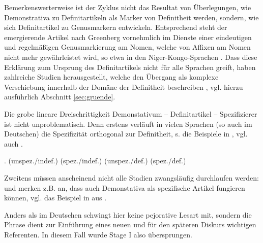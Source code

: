 Bemerkenswerterweise ist der Zyklus nicht das Resultat von Überlegungen, wie Demonstrativa zu Definitartikeln als Marker von Definitheit werden, sondern, wie sich Definitartikel zu Genusmarkern entwickeln. Entsprechend steht der emergierende Artikel nach Greenberg vornehmlich im Dienste einer eindeutigen und regelmäßigen Genusmarkierung am Nomen, welche von Affixen am Nomen nicht mehr gewährleistet wird, so etwa in den Niger-Kongo-Sprachen \parencite[55, 62]{Greenberg1978}. Dass diese Erklärung zum Ursprung des Definitartikels nicht für alle Sprachen greift, haben zahlreiche Studien herausgestellt, welche den Übergang als komplexe Verschiebung innerhalb der Domäne der Definitheit beschreiben \parencite[z.B.][]{Himmelmann1997,Lyons1999,Leiss2000,Demske2001}, vgl. hierzu ausführlich Abschnitt \ref{sec:gruende}.

Die grobe lineare Dreischrittigkeit Demonstativum -- Definitartikel -- Spezifizierer ist nicht unproblematisch. Denn erstens verläuft in vielen Sprachen (so auch im Deutschen) die Spezifizität orthogonal zur Definitheit, s. die Beispiele in  \parencite[in Adaption an][245]{Studler2011}, vgl. auch \textcite{Lyons1999}. 

\begin{exe}
	\ex \label{ex:spez-ortho}   
	\begin{xlist}
		\ex \label{ex:kleid1} .  (unspez./indef.) 
		\ex \label{ex:kleid2}  (spez./indef.)
		\ex \label{ex:stud1}  (unspez./def.)
		\ex \label{ex:stud2}  (spez./def.)
		\end{xlist}
\end{exe}

\noindent 
Zweitens müssen anscheinend nicht alle Stadien zwangsläufig durchlaufen werden: \textcite[107]{Himmelmann1997} und \textcite[139]{Diessel1999} merken z.B. an, dass auch Demonstativa als spezifische Artikel fungieren können, vgl. das Beispiel in  aus \textcite[533]{deMulder2011}. 
\begin{exe}
	\ex \label{ex:guy}   
\end{exe}
\noindent 
Anders als im Deutschen schwingt hier keine pejorative Lesart mit, sondern die Phrase  dient zur Einführung eines neuen und für den späteren Diskurs wichtigen Referenten. In diesem Fall wurde Stage I also übersprungen. 

